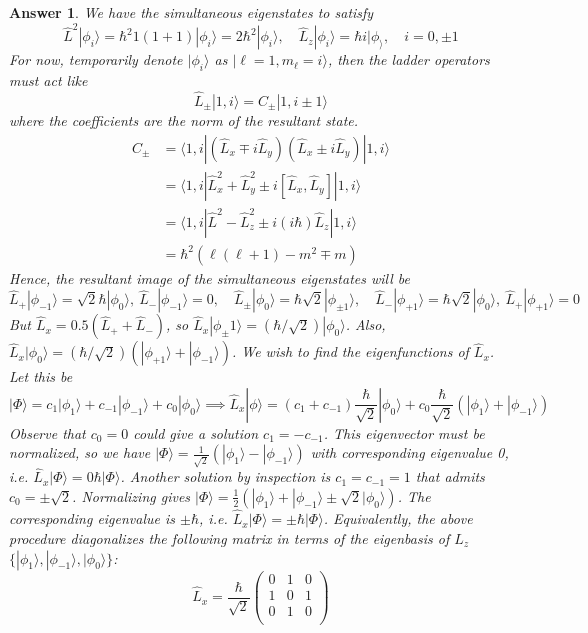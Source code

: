\documentclass[a4paper]{article}
\newtheorem{ans}{Answer}[section]
\theoremstyle{new}
\begin{document}
\begin{ans}
We have the simultaneous eigenstates to satisfy
$$\hat{L}^2|\phi_i\rangle=\hbar^2 1(1+1)|\phi_i\rangle=2\hbar^2|\phi_i\rangle,\quad\hat{L}_z|\phi_i\rangle=\hbar i|\phi_\rangle,\quad i=0,\pm1$$
For now, temporarily denote $|\phi_i\rangle$ as $|\ell=1,m_\ell=i\rangle$, then the ladder operators must act like
$$\hat{L}_\pm|1,i\rangle=C_{\pm}|1,i\pm1\rangle$$
where the coefficients are the norm of the resultant state.
\begin{align}
    C_\pm&=\langle 1,i|(\hat{L}_x\mp i\hat{L}_y)(\hat{L}_x\pm i\hat{L}_y)|1,i\rangle\nonumber\\&=\langle 1,i|\hat{L}_x^2+\hat{L}_y^2\pm i[\hat{L}_x,\hat{L}_y]|1,i\rangle\nonumber\\&=\langle 1,i|\hat{L}^2-\hat{L}_z^2\pm i(i\hbar)\hat{L}_z|1,i\rangle\nonumber\\&=\hbar^2(\ell(\ell+1)-m^2\mp m)\nonumber
\end{align}
Hence, the resultant image of the simultaneous eigenstates will be
$$\hat{L}_+|\phi_{-1}\rangle=\sqrt{2}\hbar|\phi_0\rangle,~\hat{L}_-|\phi_{-1}\rangle=0,\quad\hat{L}_\pm|\phi_0\rangle=\hbar\sqrt{2}|\phi_{\pm 1}\rangle,\quad\hat{L}_-|\phi_{+1}\rangle=\hbar\sqrt{2}|\phi_0\rangle,~\hat{L}_+|\phi_{+1}\rangle=0$$
But $\hat{L}_x=0.5(\hat{L}_++\hat{L}_-)$, so $\hat{L}_x|\phi_\pm1\rangle=(\hbar/\sqrt{2})|\phi_0\rangle$. Also, $\hat{L}_x|\phi_0\rangle=(\hbar/\sqrt{2})(|\phi_{+1}\rangle+|\phi_{-1}\rangle)$. We wish to find the eigenfunctions of $\hat{L}_x$. Let this be
$$|\Phi\rangle=c_1|\phi_1\rangle+c_{-1}|\phi_{-1}\rangle+c_0|\phi_0\rangle\implies\hat{L}_x|\phi\rangle=(c_1+c_{-1})\frac{\hbar}{\sqrt{2}}|\phi_0\rangle+c_0\frac{\hbar}{\sqrt{2}}(|\phi_1\rangle+|\phi_{-1}\rangle)$$
Observe that $c_0=0$ could give a solution $c_1=-c_{-1}$. This eigenvector must be normalized, so we have $|\Phi\rangle=\frac{1}{\sqrt{2}}(|\phi_1\rangle-|\phi_{-1}\rangle)$ with corresponding eigenvalue 0, i.e. $\hat{L}_x|\Phi\rangle=0\hbar|\Phi\rangle$. Another solution by inspection is $c_1=c_{-1}=1$ that admits $c_0=\pm\sqrt{2}$. Normalizing gives $|\Phi\rangle=\frac{1}{2}(|\phi_1\rangle+|\phi_{-1}\rangle\pm\sqrt{2}|\phi_0\rangle)$. The corresponding eigenvalue is $\pm\hbar$, i.e. $\hat{L}_x|\Phi\rangle=\pm\hbar|\Phi\rangle$. Equivalently, the above procedure diagonalizes the following matrix in terms of the eigenbasis of $\hat{L}_z$  $\{|\phi_1\rangle,|\phi_{-1}\rangle,|\phi_0\rangle\}$:
$$\hat{L}_x=\frac{\hbar}{\sqrt{2}}\begin{pmatrix}0&1&0\\1&0&1\\0&1&0\\\end{pmatrix}$$

\end{ans}
\end{document}
